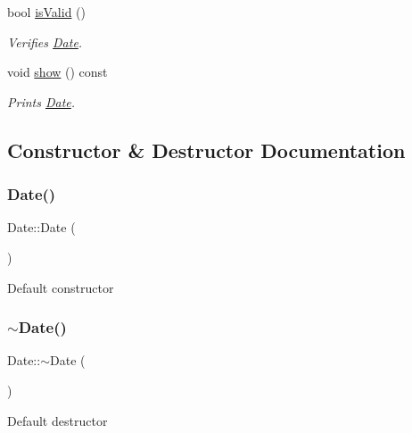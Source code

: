 \begin{DoxyCompactItemize}
bool \hyperlink{class_date_a7d9aaa9db591413e21c8b85fdae130ad}{is\+Valid} ()
\begin{DoxyCompactList}\small\item\em Verifies \hyperlink{class_date}{Date}. \end{DoxyCompactList}\item 
void \hyperlink{class_date_a37f8fc7ca1692df7a8b265099c061721}{show} () const
\begin{DoxyCompactList}\small\item\em Prints \hyperlink{class_date}{Date}. \end{DoxyCompactList}\end{DoxyCompactItemize}


\subsection{Constructor \& Destructor Documentation}
\mbox{\label{class_date_a4e59ed4ba66eec61c27460c5d09fa1bd}} 
\subsubsection{\texorpdfstring{Date()}{Date()}\hspace{0.1cm}{\footnotesize\ttfamily [1/3]}}
{\footnotesize\ttfamily Date\+::\+Date (\begin{DoxyParamCaption}{ }\end{DoxyParamCaption})}

Default constructor \mbox{\label{class_date_ade4b469433b7966cc034cbcc6799233b}} 
\subsubsection{\texorpdfstring{$\sim$\+Date()}{~Date()}}
{\footnotesize\ttfamily Date\+::$\sim$\+Date (\begin{DoxyParamCaption}{ }\end{DoxyParamCaption})}

Default destructor \mbox{\label{class_date_a5277264fbbce7f4ebfcbcc362d6d62e7}} 
